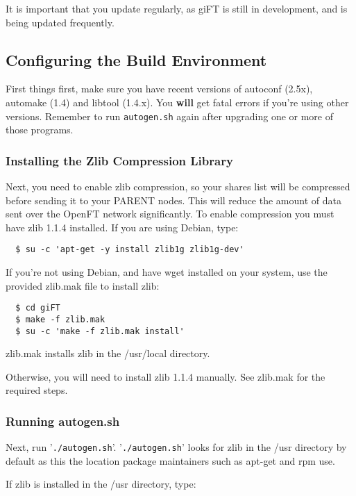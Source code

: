 \documentclass[10pt]{article}
\begin{document}
It is important that you update regularly, as giFT is still in
development, and is being updated frequently.

\subsection{Configuring the Build Environment}

First things first, make sure you have recent versions of autoconf
(2.5x), automake (1.4) and libtool (1.4.x). You \textbf{will} get
fatal errors if you're using other versions. Remember to run
\verb|autogen.sh| again after upgrading one or more of those
programs.

\subsubsection{Installing the Zlib Compression Library}

Next, you need to enable zlib compression, so your shares list
will be compressed before sending it to your PARENT nodes. This
will reduce the amount of data sent over the OpenFT network
significantly. To enable compression you must have zlib 1.1.4
installed. If you are using Debian, type:

\begin{verbatim}
  $ su -c 'apt-get -y install zlib1g zlib1g-dev'
\end{verbatim}

If you're not using Debian, and have wget installed on your system, 
use the provided zlib.mak file to install zlib:

\begin{verbatim}
  $ cd giFT
  $ make -f zlib.mak
  $ su -c 'make -f zlib.mak install'
\end{verbatim}

zlib.mak installs zlib in the /usr/local directory.

Otherwise, you will need to install zlib 1.1.4 manually.
See zlib.mak for the required steps.

\subsubsection{Running autogen.sh}

Next, run '\verb|./autogen.sh|'.
'\verb|./autogen.sh|' looks for zlib in the /usr directory by default
as this the location package maintainers such as apt-get and rpm use.

If zlib is installed in the /usr directory, type:
\end{document}
